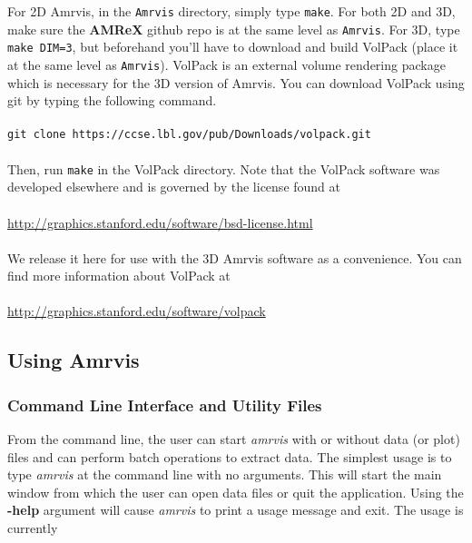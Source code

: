 \documentclass{article}
\begin{document}
For 2D Amrvis, in the {\tt Amrvis} directory, simply type {\tt make}.
For both 2D and 3D, make sure the {\bf AMReX} github repo is at the same level as {\tt Amrvis}.
For 3D, type {\tt make DIM=3}, but beforehand you'll have to download and build VolPack (place it at the same level as {\tt Amrvis}).
VolPack is an external volume rendering package which is necessary for the 3D version of Amrvis.
You can download VolPack using git by typing the following command.\\ \\
{\tt git clone https://ccse.lbl.gov/pub/Downloads/volpack.git}\\ \\
Then, run {\tt make} in the VolPack directory.
Note that the VolPack software was developed elsewhere and is governed by the license found at\\ \\
\url{http://graphics.stanford.edu/software/bsd-license.html}\\ \\
We release it here for use with the 3D Amrvis software as a convenience. You can find more information about VolPack at \\ \\
\url{http://graphics.stanford.edu/software/volpack}
\subsection{Using Amrvis}

\subsubsection{Command Line Interface and Utility Files}

From the command line, the user can start {\em amrvis} with or without
data (or plot) files and can perform batch operations
to extract data.  The simplest usage is to type {\em amrvis} at the command
line with no arguments.  This will start the main window from which
the user can open data files or quit the application.  Using the {\bf -help}
argument will cause {\em amrvis} to print a usage message and exit.  The usage
is currently
\end{document}
